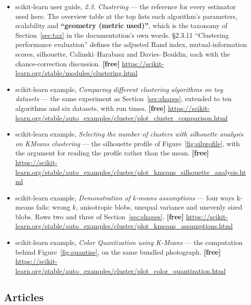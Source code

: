 \documentclass[11pt]{article}
\begin{document}
\begin{itemize}[leftmargin=*]
  \item scikit-learn user guide, \emph{2.3. Clustering} --- the reference for
    every estimator used here. The overview table at the top lists each
    algorithm's parameters, scalability and \textbf{``geometry (metric
    used)''}, which is the taxonomy of Section~\ref{sec:tax} in the
    documentation's own words. \S2.3.11 ``Clustering performance evaluation''
    defines the adjusted Rand index, mutual-information scores, silhouette,
    Calinski--Harabasz and Davies--Bouldin, each with the chance-correction
    discussion. \textbf{[free]}
    \url{https://scikit-learn.org/stable/modules/clustering.html}
  \item scikit-learn example, \emph{Comparing different clustering algorithms
    on toy datasets} --- the same experiment as Section~\ref{sec:shapes},
    extended to ten algorithms and six datasets, with run times.
    \textbf{[free]}
    \url{https://scikit-learn.org/stable/auto_examples/cluster/plot_cluster_comparison.html}
  \item scikit-learn example, \emph{Selecting the number of clusters with
    silhouette analysis on KMeans clustering} --- the silhouette profile of
    Figure~\ref{fig:silprofile}, with the argument for reading the profile
    rather than the mean. \textbf{[free]}
    \url{https://scikit-learn.org/stable/auto_examples/cluster/plot_kmeans_silhouette_analysis.html}
  \item scikit-learn example, \emph{Demonstration of k-means assumptions} ---
    four ways k-means fails: wrong $k$, anisotropic blobs, unequal variance
    and unevenly sized blobs. Rows two and three of
    Section~\ref{sec:shapes}. \textbf{[free]}
    \url{https://scikit-learn.org/stable/auto_examples/cluster/plot_kmeans_assumptions.html}
  \item scikit-learn example, \emph{Color Quantization using K-Means} --- the
    computation behind Figure~\ref{fig:quantise}, on the same bundled
    photograph. \textbf{[free]}
    \url{https://scikit-learn.org/stable/auto_examples/cluster/plot_color_quantization.html}
\end{itemize}

\subsection*{Articles}
\end{document}
